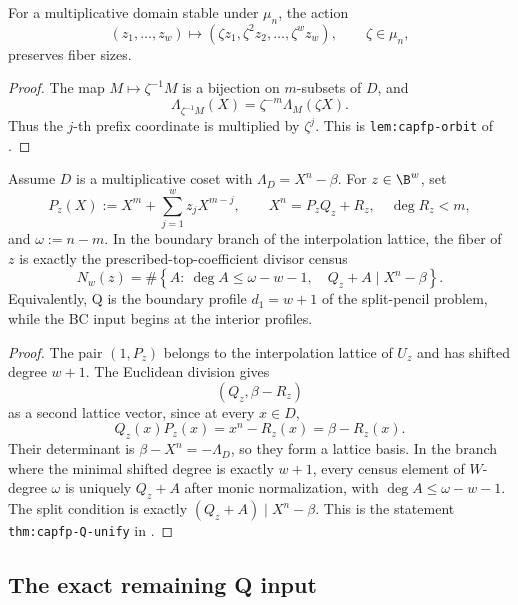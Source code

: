 \begin{proposition}\label{prop:q-orbit}
For a multiplicative domain stable under \(\mu_n\), the action
\[
        (z_1,\ldots,z_w)\longmapsto(\zeta z_1,\zeta^2z_2,\ldots,\zeta^wz_w),
        \qquad \zeta\in\mu_n,
\]
preserves fiber sizes.
\end{proposition}

\begin{proof}
The map \(M\mapsto \zeta^{-1}M\) is a bijection on \(m\)-subsets of \(D\), and
\[
        \Lambda_{\zeta^{-1}M}(X)=\zeta^{-m}\Lambda_M(\zeta X).
\]
Thus the \(j\)-th prefix coordinate is multiplied by \(\zeta^j\).  This is
\texttt{lem:capfp-orbit} of \cite{CAP25v13}.
\end{proof}

\begin{proposition}
\label{prop:q-boundary-divisor}
Assume \(D\) is a multiplicative coset with
\(\Lambda_D=X^n-\beta\).  For \(z\in\B^w\), set
\[
        P_z(X):=X^m+\sum_{j=1}^{w}z_jX^{m-j},
        \qquad X^n=P_zQ_z+R_z,\quad \deg R_z<m,
\]
and \(\omega:=n-m\).  In the boundary branch of the interpolation lattice,
the fiber of \(z\) is exactly the prescribed-top-coefficient divisor census
\[
        N_w(z)
        =
        \#\left\{A:\ \deg A\le \omega-w-1,\quad Q_z+A\mid X^n-\beta\right\}.
\]
Equivalently, Q is the boundary profile \(d_1=w+1\) of the split-pencil
problem, while the BC input begins at the interior profiles.
\end{proposition}

\begin{proof}
The pair \((1,P_z)\) belongs to the interpolation lattice of \(U_z\) and has
shifted degree \(w+1\).  The Euclidean division gives
\[
        (Q_z,\beta-R_z)
\]
as a second lattice vector, since at every \(x\in D\),
\[
        Q_z(x)P_z(x)=x^n-R_z(x)=\beta-R_z(x).
\]
Their determinant is \(\beta-X^n=-\Lambda_D\), so they form a lattice basis.
In the branch where the minimal shifted degree is exactly \(w+1\), every census
element of \(W\)-degree \(\omega\) is uniquely \(Q_z+A\) after monic
normalization, with \(\deg A\le\omega-w-1\).  The split condition is exactly
\((Q_z+A)\mid X^n-\beta\).  This is the statement
\texttt{thm:capfp-Q-unify} in \cite{CAP25v13}.
\end{proof}

\subsection{The exact remaining Q input}

